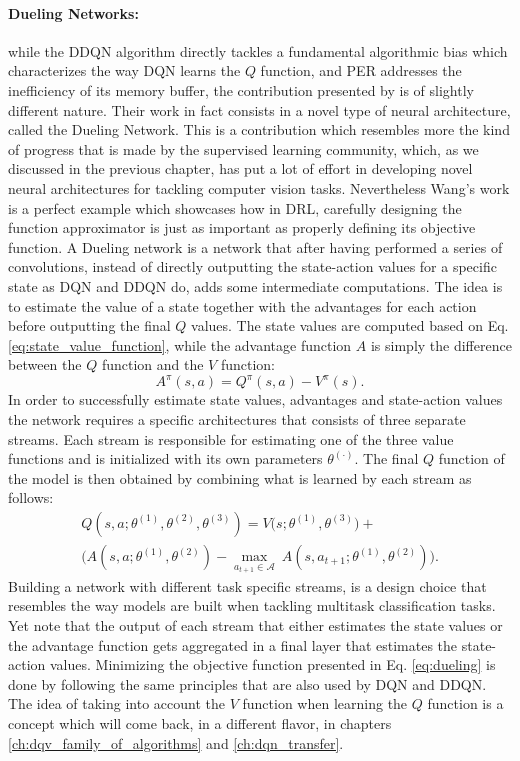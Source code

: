 \paragraph{Dueling Networks:} while the DDQN algorithm directly tackles a fundamental algorithmic bias which characterizes the way DQN learns the $Q$ function, and PER addresses the inefficiency of its memory buffer, the contribution presented by \citet{wang2016dueling} is of slightly different nature. Their work in fact consists in a novel type of neural architecture, called the Dueling Network. This is a contribution which resembles more the kind of progress that is made by the supervised learning community, which, as we discussed in the previous chapter, has put a lot of effort in developing novel neural architectures for tackling computer vision tasks. Nevertheless Wang's work is a perfect example which showcases how in DRL, carefully designing the function approximator is just as important as properly defining its objective function. A Dueling network is a network that after having performed a series of convolutions, instead of directly outputting the state-action values for a specific state as DQN and DDQN do, adds some intermediate computations. The idea is to estimate the value of a state together with the advantages for each action before outputting the final $Q$ values. The state values are computed based on Eq. \ref{eq:state_value_function}, while the advantage function $A$ is simply the difference between the $Q$ function and the $V$ function:
\begin{equation}
	A^{\pi}(s,a) = Q^{\pi}(s,a) - V^{\pi}(s).
\end{equation}
In order to successfully estimate state values, advantages and state-action values the network requires a specific architectures that consists of three separate streams. Each stream is responsible for estimating one of the three value functions and is initialized with its own parameters $\theta^{(\cdot)}$. The final $Q$ function of the model is then obtained by combining what is learned by each stream as follows:
\begin{multline}
	Q(s,a;\theta^{(1)},\theta^{(2)},\theta^{(3)}) = V\bigl(s;\theta^{(1)},\theta^{(3)}\bigr) + \\
	\bigl(A(s,a;\theta^{(1)},\theta^{(2)}) - \underset{a_{t+1}\in \mathcal{A}}{\max}\: A(s, a_{t+1};\theta^{(1)},\theta^{(2)}) \bigr).
	\label{eq:dueling}
\end{multline}
Building a network with different task specific streams, is a design choice that resembles the way models are built when tackling multitask classification tasks. Yet note that the output of each stream that either estimates the state values or the advantage function gets aggregated in a final layer that estimates the state-action values. Minimizing the objective function presented in Eq. \ref{eq:dueling} is done by following the same principles that are also used by DQN and DDQN. The idea of taking into account the $V$ function when learning the $Q$ function is a concept which will come back, in a different flavor, in chapters \ref{ch:dqv_family_of_algorithms} and \ref{ch:dqn_transfer}.

